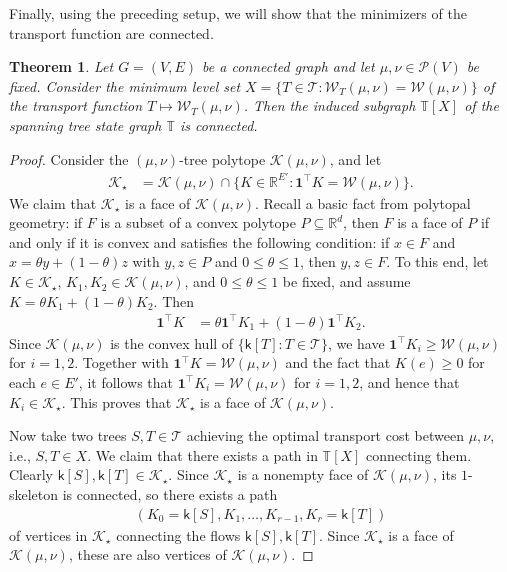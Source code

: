 \documentclass[11pt,a4paper]{article}
\newcommand{\prob}{{\mathscr{P}}}
\newcommand{\wass}{{\mathcal{W}}}
\newcommand{\setoftrees}{{\mathcal{T}}}
\newcommand{\stategraph}{{\mathbb{T}}}
\newcommand{\embedding}{{\mathsf{k}}}
\newcommand{\flowpoly}{{\mathcal{K}}}
\newtheorem{theorem}{Theorem}[section]
\begin{document}
    Finally, using the preceding setup, we will show that the minimizers of the transport function are connected.

    \begin{theorem}\label{thm:connectivity-minimizers}
        Let $G=(V,E)$ be a connected graph and let $\mu,\nu\in\prob(V)$ be fixed. Consider the minimum level set $X = \{T\in\setoftrees : \wass_{T}(\mu,\nu) = \wass(\mu,\nu)\}$ of the transport function $T\mapsto \wass_{T}(\mu,\nu)$. Then the induced subgraph $\stategraph[X]$ of the spanning tree state graph $\stategraph$ is connected.
    \end{theorem}

    \begin{proof}
        Consider the $(\mu,\nu)$-tree polytope $\flowpoly(\mu,\nu)$, and let
            \begin{align*}
                \flowpoly_\star &= \flowpoly(\mu,\nu) \cap \{K\in\mathbb{R}^{E'} : \mathbf{1}^\top K = \wass(\mu,\nu)\}.
            \end{align*}
        We claim that $\flowpoly_\star$ is a face of $\flowpoly(\mu,\nu)$. Recall a basic fact from polytopal geometry: if $F$ is a subset of a convex polytope $P\subseteq\mathbb{R}^{d}$, then $F$ is a face of $P$ if and only if it is convex and satisfies the following condition: if $x\in F$ and $x = \theta y + (1-\theta) z$ with $y, z\in P$ and $0\le \theta\le 1$, then $y, z\in F$. To this end, let $K\in\flowpoly_\star$, $K_1, K_2\in\flowpoly(\mu,\nu)$, and $0 \le \theta \le 1$ be fixed, and assume $K = \theta K_1 + (1-\theta) K_2$. Then
            \begin{align*}
                \mathbf{1}^\top K &= \theta \mathbf{1}^\top K_1 + (1-\theta) \mathbf{1}^\top K_2.
            \end{align*}
        Since $\flowpoly(\mu,\nu)$ is the convex hull of $\{\embedding[T]:T\in\setoftrees\}$, we have $\mathbf{1}^\top K_i \ge \wass(\mu,\nu)$ for $i=1,2$. Together with $\mathbf{1}^\top K = \wass(\mu,\nu)$ and the fact that $K(e)\geq 0$ for each $e\in E'$, it follows that $\mathbf{1}^\top K_i = \wass(\mu,\nu)$ for $i=1,2$, and hence that $K_i\in\flowpoly_\star$. This proves that $\flowpoly_\star$ is a face of $\flowpoly(\mu,\nu)$.

        Now take two trees $S, T\in \setoftrees$ achieving the optimal transport cost between $\mu,\nu$, i.e., $S,T\in X$. We claim that there exists a path in $\stategraph[X]$ connecting them. Clearly $\embedding[S], \embedding[T]\in \flowpoly_\star$. Since $\flowpoly_\star$ is a nonempty face of $\flowpoly(\mu,\nu)$, its $1$-skeleton is connected, so there exists a path
            \begin{align*}
                (K_0 = \embedding[S], K_1,\dots, K_{r-1}, K_{r} = \embedding[T])
            \end{align*}
        of vertices in $\flowpoly_\star$ connecting the flows $\embedding[S], \embedding[T]$. Since $\flowpoly_\star$ is a face of $\flowpoly(\mu,\nu)$, these are also vertices of $\flowpoly(\mu,\nu)$.


\end{proof}
\end{document}
